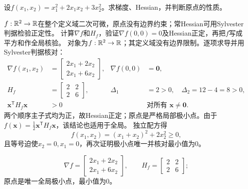 \begin{example}[二元二次函数]\label{exm:V1-C03-quadratic}\label{schema:V1-C03:CH-18}\label{schema:V1-C03:CH-32}
\normalfont\unboldmath
设$f(x_1,x_2)=x_1^2+2x_1x_2+3x_2^2$。求梯度、Hessian，并判断原点的性质。
\end{example}
\label{schema:V1-C03:CH-33}
\begin{solution}
\SolGiven $f:\mathbb{R}^2\to\mathbb{R}$在整个定义域二次可微，原点没有边界约束；常Hessian可用Sylvester判据检验正定性。
\SolPlan 计算$\nabla f$和$H_f$，验证$\nabla f(0,0)=0$及Hessian正定，再把$f$写成平方和作全局核验。
\SolDerive
对象为$f:\mathbb{R}^2\to\mathbb{R}$；其定义域没有边界限制。逐项求导并用Sylvester判据核对：
\[
\begin{aligned}
\nabla f(x_1,x_2)
&=\begin{bmatrix}2x_1+2x_2\\2x_1+6x_2\end{bmatrix},
&\nabla f(0,0)&=\boldsymbol0,\\
H_f&=\begin{bmatrix}2&2\\2&6\end{bmatrix},
&\Delta_1&=2>0,\quad \Delta_2=12-4=8>0,\\
\boldsymbol x^{\mathsf T}H_f\boldsymbol x&>0
& &\text{对所有 }\boldsymbol x\ne\boldsymbol0.
\end{aligned}
\]
两个顺序主子式均为正，故Hessian正定；原点是严格局部极小点。由于$f(\boldsymbol x)=\tfrac12\boldsymbol x^{\mathsf T}H_f\boldsymbol x$，该结论也适用于全局。
\SolCheck 独立配方得
\[
f(x_1,x_2)=(x_1+x_2)^2+2x_2^2\ge0,
\]
且等号迫使$x_2=0,x_1=0$，再次证明极小点唯一并核对最小值为$0$。

\SolAnswer
\[
\nabla f=\begin{bmatrix}2x_1+2x_2\\2x_1+6x_2\end{bmatrix},
\qquad
H_f=\begin{bmatrix}2&2\\2&6\end{bmatrix};
\]
原点是唯一全局极小点，最小值为$0$。
\end{solution}

